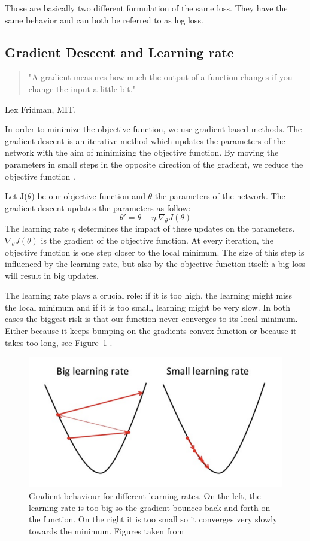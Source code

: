 Those are basically two different formulation of the same loss. They have the same behavior and can both be referred to as log loss. 
\subsection{Gradient Descent and Learning rate} \label{sec:grad_lr}
 \begin{quote}
     "A gradient measures how much the output of a function changes if you change the input a little bit."
 \end{quote} Lex Fridman, MIT. 


In order to minimize the objective function, we use gradient based methods. The gradient descent is an iterative method which updates the parameters of the network with the aim of minimizing the objective function. By moving the parameters in small steps in the opposite direction of the gradient, we reduce the objective function \cite{cs231n}. 

Let J(\(\theta\)) be our objective function and \(\theta\) the parameters of the network. The gradient descent updates the parameters as follow: \[\theta' = \theta - \eta . \nabla_\theta J(\theta) \] The learning rate \(\eta\) determines the impact of these updates on the parameters. \(\nabla_\theta J(\theta) \) is the gradient of the objective function. At every iteration, the objective function is one step closer to the local minimum. The size of this step is influenced by the learning rate, but also by the objective function itself: a big loss will result in big updates. 


The learning rate plays a crucial role: if it is too high, the learning might miss the local minimum and if it is too small, learning might be very slow. In both cases the biggest risk is that our function never converges to its local minimum. Either because it keeps bumping on the gradients convex function or because it takes too long, see Figure~\ref{fig:LR}  \cite{cs231n}.  
\begin{figure}[!htp]
    \centering
        \includegraphics[width=1\textwidth]{figures/02-LR}
        \caption[Gradient behaviour for different learning rates]{Gradient behaviour for different learning rates. On the left, the learning rate is too big so the gradient bounces back and forth on the function. On the right it is too small so it converges very slowly towards the minimum. Figures taken from \cite{gradient} }\label{fig:LR}
\end{figure}


